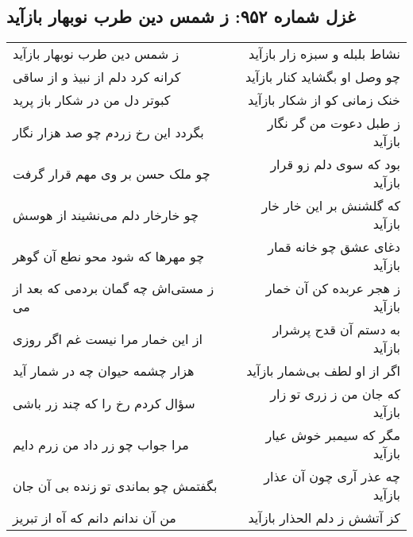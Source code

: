 \begin{center}
\section*{غزل شماره ۹۵۲: ز شمس دین طرب نوبهار بازآید}
\label{sec:0952}
\begin{longtable}{l p{0.5cm} r}
ز شمس دین طرب نوبهار بازآید
&&
نشاط بلبله و سبزه زار بازآید
\\
کرانه کرد دلم از نبیذ و از ساقی
&&
چو وصل او بگشاید کنار بازآید
\\
کبوتر دل من در شکار باز پرید
&&
خنک زمانی کو از شکار بازآید
\\
بگردد این رخ زردم چو صد هزار نگار
&&
ز طبل دعوت من گر نگار بازآید
\\
چو ملک حسن بر وی مهم قرار گرفت
&&
بود که سوی دلم زو قرار بازآید
\\
چو خارخار دلم می‌نشیند از هوسش
&&
که گلشنش بر این خار خار بازآید
\\
چو مهرها که شود محو نطع آن گوهر
&&
دغای عشق چو خانه قمار بازآید
\\
ز مستی‌اش چه گمان بردمی که بعد از می
&&
ز هجر عربده کن آن خمار بازآید
\\
از این خمار مرا نیست غم اگر روزی
&&
به دستم آن قدح پرشرار بازآید
\\
هزار چشمه حیوان چه در شمار آید
&&
اگر از او لطف بی‌شمار بازآید
\\
سؤال کردم رخ را که چند زر باشی
&&
که جان من ز زری تو زار بازآید
\\
مرا جواب چو زر داد من زرم دایم
&&
مگر که سیمبر خوش عیار بازآید
\\
بگفتمش چو بماندی تو زنده بی آن جان
&&
چه عذر آری چون آن عذار بازآید
\\
من آن ندانم دانم که آه از تبریز
&&
کز آتشش ز دلم الحذار بازآید
\\
\end{longtable}
\end{center}

